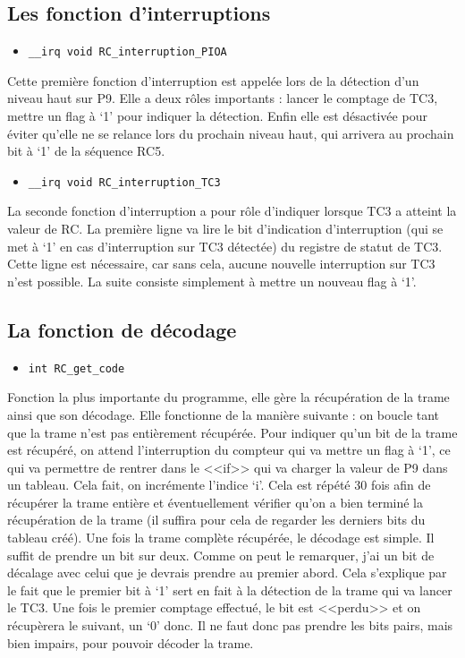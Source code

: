 \documentclass[a4paper]{report}
\begin{document}
\subsection{Les fonction d’interruptions}
\begin{itemize}
\item \texttt{\_\_irq void RC\_interruption\_PIOA}
\end{itemize}
Cette première fonction d’interruption est appelée lors de la détection d’un niveau haut sur P9.
Elle a deux rôles importants : lancer le comptage de TC3, mettre un flag à ‘1’ pour indiquer la détection.
Enfin elle est désactivée pour éviter qu’elle ne se relance lors du prochain niveau haut, qui arrivera au prochain bit à ‘1’ de la séquence RC5.
\begin{itemize}
\item \texttt{\_\_irq void RC\_interruption\_TC3}
\end{itemize}
La seconde fonction d’interruption a pour rôle d’indiquer lorsque TC3 a atteint la valeur de RC.
La première ligne va lire le bit d’indication d’interruption (qui se met à ‘1’ en cas d’interruption sur TC3 détectée) du registre de statut de TC3.
Cette ligne est nécessaire, car sans cela, aucune nouvelle interruption sur TC3 n’est possible.
La suite consiste simplement à mettre un nouveau flag à ‘1’.

\subsection{La fonction de décodage}
\begin{itemize}
\item \texttt{int RC\_get\_code}
\end{itemize}
Fonction la plus importante du programme, elle gère la récupération de la trame ainsi que son décodage.
Elle fonctionne de la manière suivante : on boucle tant que la trame n’est pas entièrement récupérée.
Pour indiquer qu’un bit de la trame est récupéré, on attend l’interruption du compteur qui va mettre un flag à ‘1’, ce qui va permettre de rentrer dans le <<if>> qui va charger la valeur de P9 dans un tableau.
Cela fait, on incrémente l’indice ‘i’.
Cela est répété 30 fois afin de récupérer la trame entière et éventuellement vérifier qu’on a bien terminé la récupération de la trame (il suffira pour cela de regarder les derniers bits du tableau créé).
Une fois la trame complète récupérée, le décodage est simple.
Il suffit de prendre un bit sur deux.
Comme on peut le remarquer, j’ai un bit de décalage avec celui que je devrais prendre au premier abord.
Cela s’explique par le fait que le premier bit à ‘1’ sert en fait à la détection de la trame qui va lancer le TC3.
Une fois le premier comptage effectué, le bit est <<perdu>> et on récupèrera le suivant, un ‘0’ donc.
Il ne faut donc pas prendre les bits pairs, mais bien impairs, pour pouvoir décoder la trame.
\end{document}
